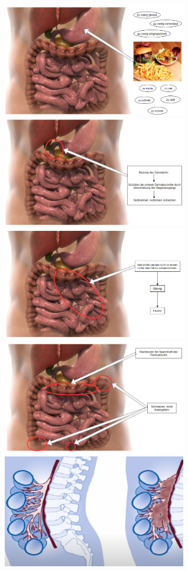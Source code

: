 \documentclass[xcolor=dvipsnames]{beamer}
\begin{document}
\begin{frame}[allowframebreaks]
        \begin{figure}
            \includegraphics[width=8cm]{../images/vergiftung_1.png}
            \includegraphics[width=8cm]{../images/vergiftung_2.png}
            \includegraphics[width=8cm]{../images/vergiftung_3.png}
            \includegraphics[width=8cm]{../images/vergiftung_4.png}
            \includegraphics[width=8cm]{../images/lymphe.png}
        \end{figure}

    \end{frame}
\end{document}
